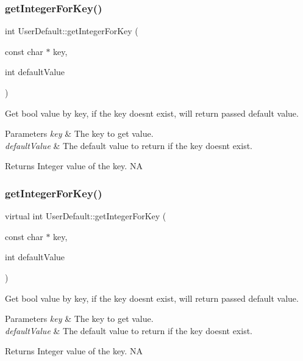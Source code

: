 \subsubsection{\texorpdfstring{get\+Integer\+For\+Key()}{getIntegerForKey()}\hspace{0.1cm}{\footnotesize\ttfamily [3/4]}}
{\footnotesize\ttfamily int User\+Default\+::get\+Integer\+For\+Key (\begin{DoxyParamCaption}\item[{const char $\ast$}]{key,  }\item[{int}]{default\+Value }\end{DoxyParamCaption})\hspace{0.3cm}{\ttfamily [virtual]}}

Get bool value by key, if the key doesn\textquotesingle{}t exist, will return passed default value. 
\begin{DoxyParams}{Parameters}
{\em key} & The key to get value. \\
\hline
{\em default\+Value} & The default value to return if the key doesn\textquotesingle{}t exist. \\
\hline
\end{DoxyParams}
\begin{DoxyReturn}{Returns}
Integer value of the key.  NA 
\end{DoxyReturn}
\mbox{\label{classUserDefault_a60d49eca521265b315ce007124633a40}} 
\subsubsection{\texorpdfstring{get\+Integer\+For\+Key()}{getIntegerForKey()}\hspace{0.1cm}{\footnotesize\ttfamily [4/4]}}
{\footnotesize\ttfamily virtual int User\+Default\+::get\+Integer\+For\+Key (\begin{DoxyParamCaption}\item[{const char $\ast$}]{key,  }\item[{int}]{default\+Value }\end{DoxyParamCaption})\hspace{0.3cm}{\ttfamily [virtual]}}

Get bool value by key, if the key doesn\textquotesingle{}t exist, will return passed default value. 
\begin{DoxyParams}{Parameters}
{\em key} & The key to get value. \\
\hline
{\em default\+Value} & The default value to return if the key doesn\textquotesingle{}t exist. \\
\hline
\end{DoxyParams}
\begin{DoxyReturn}{Returns}
Integer value of the key.  NA 
\end{DoxyReturn}
\mbox{\label{classUserDefault_afd5ed352bbd91dbe2c0c377ad31e8a59}} 
